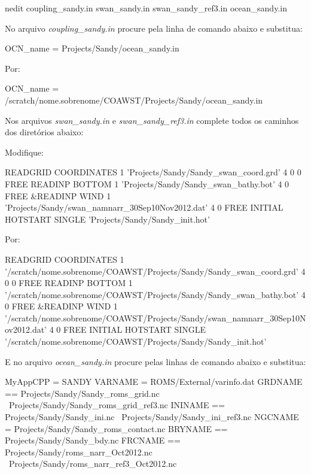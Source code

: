 \begin{bashcode}
nedit coupling_sandy.in swan_sandy.in swan_sandy_ref3.in ocean_sandy.in
\end{bashcode}
\bigskip

\noindent No arquivo \textit{coupling\_sandy.in} procure pela linha de comando abaixo e substitua:
\bigskip

\begin{bashcode}
OCN_name = Projects/Sandy/ocean_sandy.in
\end{bashcode}
\bigskip

\noindent Por:
\bigskip

\begin{bashcode}
OCN_name = /scratch/nome.sobrenome/COAWST/Projects/Sandy/ocean_sandy.in
\end{bashcode}
\bigskip

\noindent Nos arquivos \textit{swan\_sandy.in} e \textit{swan\_sandy\_ref3.in} complete todos os caminhos dos diretórios abaixo:
\bigskip

\noindent Modifique:
\bigskip

\begin{bashcode}
READGRID COORDINATES 1 'Projects/Sandy/Sandy_swan_coord.grd' 4 0 0 FREE
READINP BOTTOM 1 'Projects/Sandy/Sandy_swan_bathy.bot' 4 0 FREE
&READINP WIND 1 'Projects/Sandy/swan_namnarr_30Sep10Nov2012.dat' 4 0 FREE
INITIAL HOTSTART SINGLE 'Projects/Sandy/Sandy_init.hot'
\end{bashcode}
\bigskip

\noindent Por:
\bigskip

\begin{bashcode}[fontsize=\scriptsize]
READGRID COORDINATES 1 '/scratch/nome.sobrenome/COAWST/Projects/Sandy/Sandy_swan_coord.grd' 4 0 0 FREE
READINP BOTTOM 1 '/scratch/nome.sobrenome/COAWST/Projects/Sandy/Sandy_swan_bathy.bot' 4 0 FREE
&READINP WIND 1 '/scratch/nome.sobrenome/COAWST/Projects/Sandy/swan_namnarr_30Sep10Nov2012.dat' 4 0 FREE
INITIAL HOTSTART SINGLE '/scratch/nome.sobrenome/COAWST/Projects/Sandy/Sandy_init.hot'
\end{bashcode}
\bigskip

\noindent E no arquivo \textit{ocean\_sandy.in} procure pelas linhas de comando abaixo e substitua:
\bigskip

\begin{bashcode}
MyAppCPP = SANDY
VARNAME  = ROMS/External/varinfo.dat
GRDNAME == Projects/Sandy/Sandy_roms_grid.nc \
           Projects/Sandy/Sandy_roms_grid_ref3.nc
ININAME == Projects/Sandy/Sandy_ini.nc \
           Projects/Sandy/Sandy_ini_ref3.nc
NGCNAME =  Projects/Sandy/Sandy_roms_contact.nc
BRYNAME == Projects/Sandy/Sandy_bdy.nc
FRCNAME == Projects/Sandy/roms_narr_Oct2012.nc \
           Projects/Sandy/roms_narr_ref3_Oct2012.nc
\end{bashcode}
\bigskip


